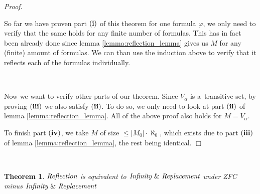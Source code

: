 \documentclass[12pt,a4paper]{article}
\newtheorem{theorem}{Theorem}[section]
\newenvironment{proof}
{\noindent \textit{Proof.}}
{\hspace*{\fill} $\Box$}
\begin{document}
\begin{proof}
\

So far we have proven part $\bold{(i)}$ of this theorem for one formula $\varphi$, we only need to verify that the same holds for any finite number of formulas. This has in fact been already done since lemma \ref{lemma:reflection_lemma} gives us $M$ for any (finite) amount of formulas. We can than use the induction above  to verify that it reflects each of the formulas individually.

\

Now we want to verify other parts of our theorem. Since $V_\alpha$ is a~transitive set, by proving $\bold{(iii)}$ we also satisfy $\bold{(ii)}$. To do so, we only need to look at part $\bold{(ii)}$ of lemma \ref{lemma:reflection_lemma}. All of the above proof also holds for $M = V_\alpha$. 

To finish part $\bold{(iv)}$, we take $M$ of size $\leq |M_0| \cdot \aleph_0$, which exists due to part $\bold{(iii)}$ of lemma \ref{lemma:reflection_lemma}, the rest being identical.
\end{proof}

\

\begin{theorem}\label{levy_equivalence_contemporary}
$\emph{Reflection}$ is equivalent to $\emph{Infinity}\ \&\ \emph{Replacement}$ under ZFC minus $\emph{Infinity}\ \&\ \emph{Replacement}$
\end{theorem}

\
\end{document}
